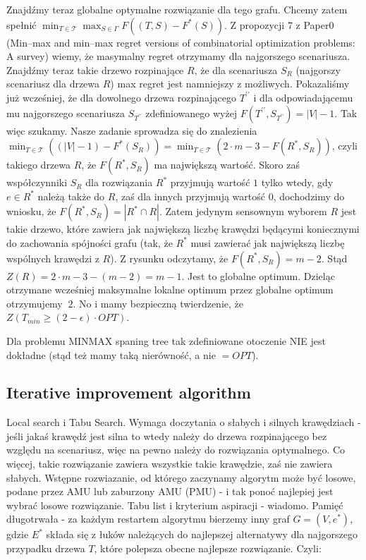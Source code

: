 Znajdźmy teraz globalne optymalne rozwiązanie dla tego grafu. Chcemy zatem spełnić $\min_{T \in \mathcal{T}} \max_{S \in \Gamma} F \left( \left( T, S \right) - F^{\ast} \left( S \right) \right)$. Z propozycji 7 z Paper0 (Min–max and min–max regret versions of combinatorial optimization problems: A survey) wiemy, że masymalny regret otrzymamy dla najgorszego scenariusza. Znajdźmy teraz takie drzewo rozpinające $R$, że dla scenariusza $S_{R}$ (najgorszy scenariusz dla drzewa $R$) max regret jest namniejszy z możliwych. Pokazaliśmy już wcześniej, że dla dowolnego drzewa rozpinającego $T^{\prime\prime}$ i dla odpowiadającemu mu najgorszego scenariusza $S_{T^{\prime\prime}}$ zdefiniowanego wyżej $F \left( T^{\prime\prime} , S_{T^{\prime\prime}} \right) = \left| V \right| - 1$. Tak więc szukamy. Nasze zadanie sprowadza się do znalezienia $\min_{T \in \mathcal{T}} \left( \left( \left| V \right| - 1 \right) - F^{\ast} \left( S_{R} \right) \right) = \min_{T \in \mathcal{T}} \left( 2 \cdot m - 3 - F \left( R^{\ast}, S_{R} \right) \right)$, czyli takiego drzewa $R$, że $F \left( R^{\ast}, S_{R} \right)$ ma największą wartość. Skoro zaś współczynniki $S_{R}$ dla rozwiązania $R^{\ast}$ przyjmują wartość $1$ tylko wtedy, gdy $e \in R^{\ast}$ należą także do $R$, zaś dla innych przyjmują wartość $0$, dochodzimy do wniosku, że $F \left( R^{\ast}, S_{R} \right) = \left| R^{\ast} \cap R \right|$. Zatem jedynym sensownym wyborem $R$ jest takie drzewo, które zawiera jak największą liczbę krawędzi będącymi koniecznymi do zachowania spójności grafu (tak, że $R^{\ast} $ musi zawierać jak największą liczbę wspólnych krawędzi z $R$). Z rysunku odczytamy, że $F \left( R^{\ast}, S_{R} \right) = m - 2$. Stąd $Z \left( R \right) = 2 \cdot m - 3 - \left( m - 2 \right) = m - 1$. Jest to globalne optimum. Dzieląc otrzymane wcześniej maksymalne lokalne optimum przez globalne optimum otrzymujemy $~2$. No i mamy bezpieczną twierdzenie, że $Z \left( T_{min} \geqslant \left( 2 - \epsilon \right) \cdot OPT \right)$.

Dla problemu MINMAX spaning tree tak zdefiniowane otoczenie NIE jest dokładne (stąd też mamy taką nierówność, a nie $ = OPT$).

\subsection{Iterative improvement algorithm}

Local search i Tabu Search. Wymaga doczytania o słabych i silnych krawędziach - jeśli jakaś krawędź jest silna to wtedy należy do drzewa rozpinającego bez względu na scenariusz, więc na pewno należy do rozwiązania optymalnego. Co więcej, takie rozwiązanie zawiera wszystkie takie krawędzie, zaś nie zawiera słabych. Wstępne rozwiazanie, od którego zaczynamy algorytm może być losowe, podane przez AMU lub zaburzony AMU (PMU) - i tak ponoć najlepiej jest wybrać losowe rozwiązanie. Tabu list i kryterium aspiracji - wiadomo. Pamięć długotrwała - za każdym restartem algorytmu bierzemy inny graf $G = \left( V, e^{\ast} \right)$, gdzie $E^{\ast}$ składa się z łuków należących do najlepszej alternatywy dla najgorszego przypadku drzewa $T$, które polepsza obecne najlepsze rozwiązanie. Czyli:

